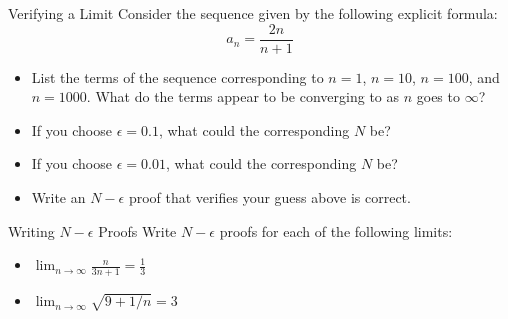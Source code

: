\begin{exercise}{Verifying a Limit \Coffeecup \Coffeecup \Coffeecup}
Consider the sequence given by the following explicit formula: $$ a_n=\frac{2n}{n+1}$$
\begin{itemize}
\item List the terms of the sequence corresponding to $n=1$, $n=10$, $n=100$, and $n=1000$.  What do the terms appear to be converging to as $n$ goes to $\infty$?
\vspace*{1in}
\item If you choose $\epsilon=0.1$, what could the corresponding $N$ be?
\vspace*{1in}
\item If you choose $\epsilon=0.01$, what could the corresponding $N$ be? 
\vspace*{1in}
\item  Write an $N-\epsilon$ proof that verifies your guess above is correct.
\vspace*{3in}
\end{itemize}
\end{exercise}

\begin{exercise}{Writing $N-\epsilon$ Proofs \Coffeecup \Coffeecup \Coffeecup}
Write $N- \epsilon$ proofs for each of the following limits:

\begin{itemize}

\item $ \lim_{n \rightarrow \infty } \frac{n}{3n+1} = \frac{1}{3} $

\vspace*{3in}
\item $ \lim_{n \rightarrow \infty } \sqrt{9+1/n} = 3 $ 
\vspace*{3in}

\end{itemize}
\end{exercise}
